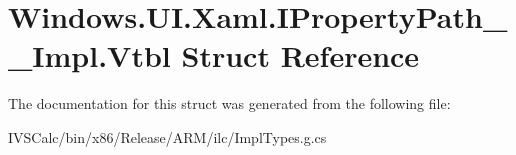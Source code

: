 \hypertarget{struct_windows_1_1_u_i_1_1_xaml_1_1_i_property_path_____impl_1_1_vtbl}{}\section{Windows.\+U\+I.\+Xaml.\+I\+Property\+Path\+\_\+\+\_\+\+Impl.\+Vtbl Struct Reference}
\label{struct_windows_1_1_u_i_1_1_xaml_1_1_i_property_path_____impl_1_1_vtbl}


The documentation for this struct was generated from the following file\+:\begin{DoxyCompactItemize}
\item 
I\+V\+S\+Calc/bin/x86/\+Release/\+A\+R\+M/ilc/Impl\+Types.\+g.\+cs\end{DoxyCompactItemize}
